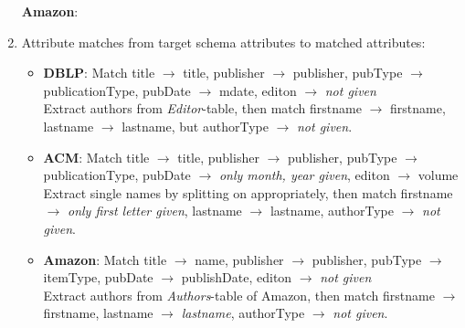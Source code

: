 \documentclass{scrartcl}
\begin{document}
\begin{enumerate}
		\textbf{Amazon}:
		\begin{center}
		\end{center}
		
		\item Attribute matches from target schema attributes to matched attributes:
		\begin{itemize}
			\item \textbf{DBLP}: Match title $\to$ title, publisher $\to$ publisher, pubType $\to$ publicationType, pubDate $\to$ mdate, editon $\to$ \textit{not given}\\
			
			Extract authors from \textit{Editor}-table, then match
			firstname $\to$ firstname, lastname $\to$ lastname, but authorType $\to$ \textit{not given}.
			
			\item \textbf{ACM}: Match title $\to$ title, publisher $\to$ publisher, pubType $\to$ publicationType, pubDate $\to$ \textit{only month, year given}, editon $\to$ volume\\
			
			Extract single names by splitting on appropriately, then match
			firstname $\to$ \textit{only first letter given}, lastname $\to$ lastname, authorType $\to$ \textit{not given}.
			
			\item \textbf{Amazon}: Match title $\to$ name, publisher $\to$ publisher, pubType $\to$ itemType, pubDate $\to$ publishDate, editon $\to$ \textit{not given}\\
			
			Extract authors from \textit{Authors}-table of Amazon, then match
			firstname $\to$ firstname, lastname $\to$ \textit{lastname}, authorType $\to$ \textit{not given}.
		\end{itemize}
		
	\end{enumerate}
	
\end{document}
